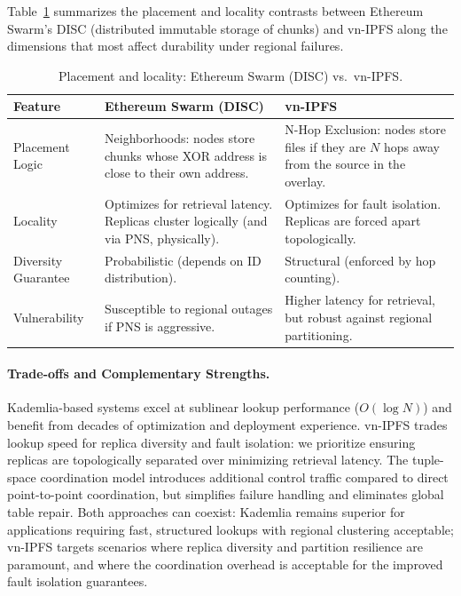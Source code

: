 \documentclass[runningheads]{llncs}
\begin{document}
Table~\ref{tab:swarm-vnipfs} summarizes the placement and locality contrasts between Ethereum Swarm's DISC (distributed immutable storage of chunks) and vn-IPFS along the dimensions that most affect durability under regional failures.

\begin{table}[t]
\caption{Placement and locality: Ethereum Swarm (DISC) vs.\ vn-IPFS.}
\label{tab:swarm-vnipfs}
\centering
\begin{tabular}{@{}lp{4.1cm}p{4.1cm}@{}}
\hline
\textbf{Feature} & \textbf{Ethereum Swarm (DISC)} & \textbf{vn-IPFS} \\
\hline
Placement Logic & Neighborhoods: nodes store chunks whose XOR address is close to their own address. & N-Hop Exclusion: nodes store files if they are $N$ hops away from the source in the overlay. \\
Locality & Optimizes for retrieval latency. Replicas cluster logically (and via PNS, physically). & Optimizes for fault isolation. Replicas are forced apart topologically. \\
Diversity Guarantee & Probabilistic (depends on ID distribution). & Structural (enforced by hop counting). \\
Vulnerability & Susceptible to regional outages if PNS is aggressive. & Higher latency for retrieval, but robust against regional partitioning. \\
\hline
\end{tabular}
\end{table}

\paragraph{Trade-offs and Complementary Strengths.}
Kademlia-based systems excel at sublinear lookup performance ($O(\log N)$) and benefit from decades of optimization and deployment experience. vn-IPFS trades lookup speed for replica diversity and fault isolation: we prioritize ensuring replicas are topologically separated over minimizing retrieval latency. The tuple-space coordination model introduces additional control traffic compared to direct point-to-point coordination, but simplifies failure handling and eliminates global table repair. Both approaches can coexist: Kademlia remains superior for applications requiring fast, structured lookups with regional clustering acceptable; vn-IPFS targets scenarios where replica diversity and partition resilience are paramount, and where the coordination overhead is acceptable for the improved fault isolation guarantees.
\end{document}
